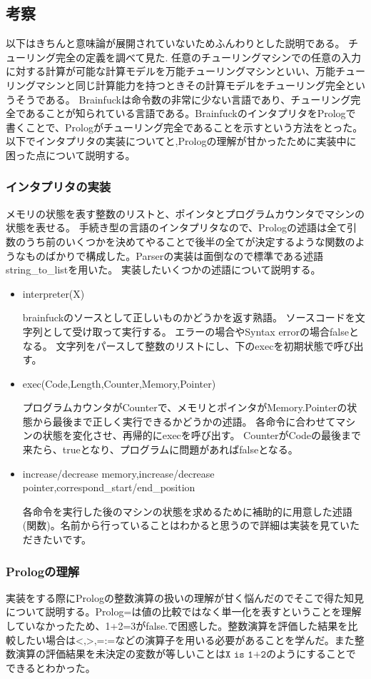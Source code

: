 \documentclass[11pt,a4paper]{jsarticle}
\begin{document}
\subsection*{考察}
以下はきちんと意味論が展開されていないためふんわりとした説明である。
チューリング完全の定義を調べて見た.
任意のチューリングマシンでの任意の入力に対する計算が可能な計算モデルを万能チューリングマシンといい、万能チューリングマシンと同じ計算能力を持つときその計算モデルをチューリング完全というそうである。
Brainfuckは命令数の非常に少ない言語であり、チューリング完全であることが知られている言語である。BrainfuckのインタプリタをPrologで書くことで、Prologがチューリング完全であることを示すという方法をとった。
以下でインタプリタの実装についてと,Prologの理解が甘かったために実装中に困った点について説明する。
\subsubsection*{インタプリタの実装}
メモリの状態を表す整数のリストと、ポインタとプログラムカウンタでマシンの状態を表せる。
手続き型の言語のインタプリタなので、Prologの述語は全て引数のうち前のいくつかを決めてやることで後半の全てが決定するような関数のようなものばかりで構成した。Parserの実装は面倒なので標準である述語string\_to\_listを用いた。
実装したいくつかの述語について説明する。
\begin{itemize}
	\item interpreter(X) \par
	brainfuckのソースとして正しいものかどうかを返す熟語。
	ソースコードを文字列として受け取って実行する。
	エラーの場合やSyntax errorの場合falseとなる。
	文字列をパースして整数のリストにし、下のexecを初期状態で呼び出す。
	\item exec(Code,Length,Counter,Memory,Pointer) \par
	プログラムカウンタがCounterで、メモリとポインタがMemory.Pointerの状態から最後まで正しく実行できるかどうかの述語。
	各命令に合わせてマシンの状態を変化させ、再帰的にexecを呼び出す。
	CounterがCodeの最後まで来たら、trueとなり、プログラムに問題があればfalseとなる。
	\item increase/decrease memory,increase/decrease pointer,correspond\_start/end\_position \par
	各命令を実行した後のマシンの状態を求めるために補助的に用意した述語(関数)。名前から行っていることはわかると思うので詳細は実装を見ていただきたいです。
\end{itemize}
\subsubsection*{Prologの理解}
実装をする際にPrologの整数演算の扱いの理解が甘く悩んだのでそこで得た知見について説明する。Prolog=は値の比較ではなく単一化を表すということを理解していなかったため、1+2=3がfalse.で困惑した。整数演算を評価した結果を比較したい場合は$\texttt{<,>,=:=}$などの演算子を用いる必要があることを学んだ。また整数演算の評価結果を未決定の変数が等しいことは$\texttt{X is 1+2}$のようにすることでできるとわかった。
\end{document}
